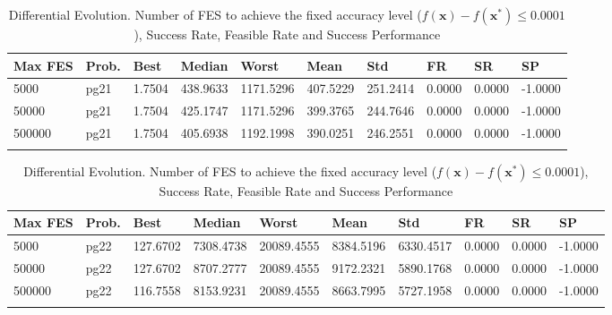\documentclass[10pt, a4paper]{book}
\begin{document}
\begin{center}
\begin{longtable}{l l l l l l l l l l}
\textbf{Max FES} & \textbf{Prob.} & \textbf{Best} & \textbf{Median} & \textbf{Worst} & \textbf{Mean} & \textbf{Std} & \textbf{FR} & \textbf{SR} & \textbf{SP} \\
\hline
5000 & pg21 & 1.7504 & 438.9633 & 1171.5296 & 407.5229 & 251.2414 & 0.0000 & 0.0000 & -1.0000 \\
50000 & pg21 & 1.7504 & 425.1747 & 1171.5296 & 399.3765 & 244.7646 & 0.0000 & 0.0000 & -1.0000 \\
500000 & pg21 & 1.7504 & 405.6938 & 1192.1998 & 390.0251 & 246.2551 & 0.0000 & 0.0000 & -1.0000 \\

\caption{ Differential Evolution. Number of FES to achieve the fixed accuracy level ($f(\mathbf{x}) - f(\mathbf{x}^{*}) \leq 0.0001$), Success Rate, Feasible Rate and Success Performance }
\end{longtable}
\end{center}

\begin{center}
\begin{longtable}{l l l l l l l l l l}
\textbf{Max FES} & \textbf{Prob.} & \textbf{Best} & \textbf{Median} & \textbf{Worst} & \textbf{Mean} & \textbf{Std} & \textbf{FR} & \textbf{SR} & \textbf{SP} \\
\hline
5000 & pg22 & 127.6702 & 7308.4738 & 20089.4555 & 8384.5196 & 6330.4517 & 0.0000 & 0.0000 & -1.0000 \\
50000 & pg22 & 127.6702 & 8707.2777 & 20089.4555 & 9172.2321 & 5890.1768 & 0.0000 & 0.0000 & -1.0000 \\
500000 & pg22 & 116.7558 & 8153.9231 & 20089.4555 & 8663.7995 & 5727.1958 & 0.0000 & 0.0000 & -1.0000 \\

\caption{ Differential Evolution. Number of FES to achieve the fixed accuracy level ($f(\mathbf{x}) - f(\mathbf{x}^{*}) \leq 0.0001$), Success Rate, Feasible Rate and Success Performance }
\end{longtable}
\end{center}
\end{document}
